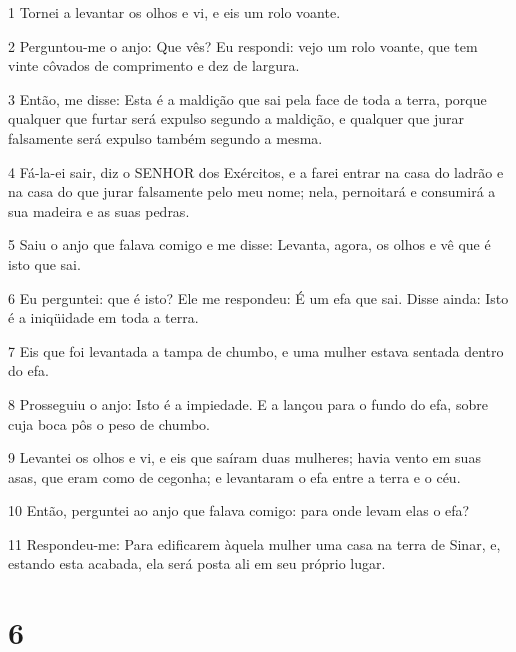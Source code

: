 \par 1 Tornei a levantar os olhos e vi, e eis um rolo voante.
\par 2 Perguntou-me o anjo: Que vês? Eu respondi: vejo um rolo voante, que tem vinte côvados de comprimento e dez de largura.
\par 3 Então, me disse: Esta é a maldição que sai pela face de toda a terra, porque qualquer que furtar será expulso segundo a maldição, e qualquer que jurar falsamente será expulso também segundo a mesma.
\par 4 Fá-la-ei sair, diz o SENHOR dos Exércitos, e a farei entrar na casa do ladrão e na casa do que jurar falsamente pelo meu nome; nela, pernoitará e consumirá a sua madeira e as suas pedras.
\par 5 Saiu o anjo que falava comigo e me disse: Levanta, agora, os olhos e vê que é isto que sai.
\par 6 Eu perguntei: que é isto? Ele me respondeu: É um efa que sai. Disse ainda: Isto é a iniqüidade em toda a terra.
\par 7 Eis que foi levantada a tampa de chumbo, e uma mulher estava sentada dentro do efa.
\par 8 Prosseguiu o anjo: Isto é a impiedade. E a lançou para o fundo do efa, sobre cuja boca pôs o peso de chumbo.
\par 9 Levantei os olhos e vi, e eis que saíram duas mulheres; havia vento em suas asas, que eram como de cegonha; e levantaram o efa entre a terra e o céu.
\par 10 Então, perguntei ao anjo que falava comigo: para onde levam elas o efa?
\par 11 Respondeu-me: Para edificarem àquela mulher uma casa na terra de Sinar, e, estando esta acabada, ela será posta ali em seu próprio lugar.

\chapter{6}

